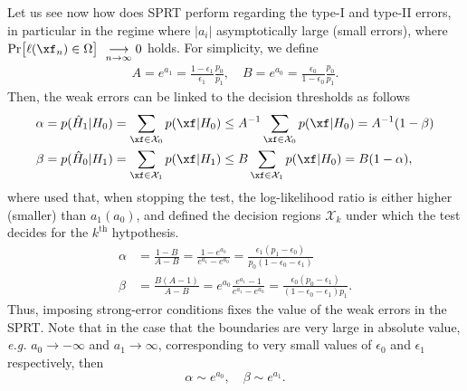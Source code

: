 Let us see now how does SPRT perform regarding the type-I and type-II errors, in particular in the regime where $|a_{i}|$ asymptotically large (small errors), where  $\text{Pr}\big[\ell(\xf_n) \in \Omega\big] \underset{n\rightarrow\infty}{\longrightarrow}0$ holds. For simplicity, we define
\begin{align*}
A = e^{a_1} = \frac{1-\epsilon_1}{\epsilon_1} \frac{p_0}{p_1}, \quad B =e^{a_0} =  \frac{\epsilon_0}{1-\epsilon_0} \frac{p_0}{p_1}.
\end{align*}
Then, the weak errors can be linked to the decision thresholds as follows
\begin{align}
\alpha &= p(\hat{H}_1|H_0) = \sum_{\xf \in \mathbf{\mathcal{X}}_0} p(\xf|H_0) \leq A^{-1}  \sum_{\xf \in \mathbf{\mathcal{X}}_0} p(\xf|H_0) = A^{-1}(1-\beta)\\
\beta &= p(\hat{H}_0|H_1) = \sum_{\xf \in \mathbf{\mathcal{X}}_1} p(\xf|H_1)\leq B \sum_{\xf \in \mathbf{\mathcal{X}}_1} p(\xf|H_0) = B (1-\alpha),
\end{align}
where used that, when stopping the test, the log-likelihood ratio is either higher (smaller) than $a_1(a_0)$, and defined the decision regions $\mathbf{\mathcal{X}}_k$ under which the test decides for the $k^\text{th}$ hytpothesis. 
\begin{align}\label{eq:weakErrorsSPRT}
\alpha &= \frac{1-B}{A-B} = \frac{1-e^{a_0}}{e^{a_1}-e^{a_0}} = \frac{\epsilon_1(p_1 -\epsilon_0)}{p_0(1-\epsilon_0 -\epsilon_1)}\\
\beta &= \frac{B(A-1)}{A-B} =  e^{a_0}\frac{e^{a_1}-1}{e^{a_1}-e^{a_0}} = \frac{\epsilon_0 (p_0 - \epsilon_1)}{(1-\epsilon_0-\epsilon_1)p_1}.
\end{align}
Thus, imposing strong-error conditions fixes the value of the weak errors in the SPRT. Note that in the case that the boundaries are very large in absolute value, \textit{e.g.} $a_0 \rightarrow -\infty$ and $a_1 \rightarrow\infty$, corresponding to very small values of $\epsilon_0$ and $\epsilon_1$ respectively, then
\begin{equation}\label{eq:largeBoundaries}
\alpha \sim e^{a_0}, \quad \beta \sim e^{a_1}.
\end{equation}

